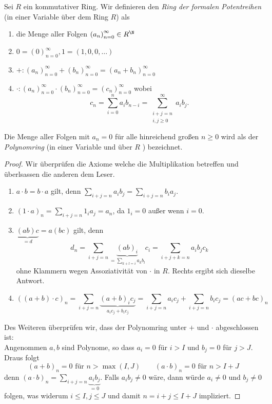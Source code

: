 \begin{definition}
	Sei $R$ ein kommutativer Ring. Wir definieren den \emph{Ring der formalen Potentreihen} (in einer Variable über dem Ring $R $) als 
	\begin{enumerate}
		\item die Menge aller Folgen $\left(a_{n}\right)^{\infty}_{n=0} \in R^{\N}$
		\item $0 = \left(0\right)^{\infty}_{n=0}, 1 = (1,0,0,\ldots)$ 
		\item $+: \left(a_{n}\right)^{\infty}_{n=0} + \left(b_{n}\right)^{\infty}_{n=0} = (a_{n} + b_{n})^{\infty}_{n=0}$ 
		\item $\cdot: \left(a_{n}\right)^{\infty}_{n=0} \cdot \left(b_{n}\right)^{\infty}_{n=0} = \left(c_{n}\right)^{\infty}_{n=0} $ wobei
			\[
				c_{n} = \sum_{i=0}^{n} a_{i} b_{n-i} = \sum_{\substack{i+j=n \\ i,j \geq 0}}^{\infty} a_{i} b_{j}
			.\] 
	\end{enumerate}
	Die Menge aller Folgen mit $a_{n} = 0$ für alle hinreichend großen $n \geq 0$ wird als der \emph{Polynomring} (in einer Variable und über $R$ ) bezeichnet.
\end{definition}

\begin{proof}
	Wir überprüfen die Axiome welche die Multiplikation betreffen und überlsassen die anderen dem Leser.
	\begin{enumerate}
		\item $a\cdot b = b\cdot a$ gilt, denn $\sum_{i+j=n} a_{i} b_{j} = \sum_{i+j=n} b_{i} a_{j}$.
		\item $(1\cdot a)_{n} = \sum_{i+j=n} 1_{i} a_{j} = a_{n}$, da $1_{i} = 0$ außer wenn  $i=0$.
		\item $\underbrace{(ab)c}_{=d} = a(bc)$ gilt, denn
			\[
				d_{n} = \sum_{i+j = n} \underbrace{(ab)_{i}}_{= \sum_{k+l = i} a_{k} b_{l}} c_{i} = \sum_{i+j+k=n} a_{i} b_{j} c_{k}
			\] 
			ohne Klammern wegen Assoziativität von $\cdot $ in $R$. Rechts ergibt sich dieselbe Antwort.
		\item \[((a+b)\cdot c)_{n} = \sum_{i+j=n} \underbrace{(a+b)_{i} c_{j}}_{a_{i} c_{j} + b_{i} c_{j}} = \sum_{i+j=n} a_{i} c_{j} + \sum_{i+j=n} b_{i} c_{j} = (ac +bc)_{n}\]
	\end{enumerate}
	Des Weiteren überprüfen wir, dass der Polynomring unter $+$ und $\cdot $ abgeschlossen ist:\\
	Angenommen $a,b$ sind Polynome, so dass $a_{i} = 0$ für $i > I$ und $b_{j} = 0$ für $j > J$.
	Draus folgt 
	\[
		(a+b)_{n} = 0 \text{ für } n > \max(I,J) \qquad (a\cdot b)_{n} = 0 \text{ für } n > I+J
	\]
	denn $(a\cdot b)_{n} = \sum_{i+j=n} \underbrace{a_{i} b_{j}}_{=0}$. Falls $a_{i} b_{j} \neq  0$ wäre, dann würde $a_{i}\neq 0$ und $b_{j} \neq 0$ folgen,
	was widerum $i \leq I, j \leq J$ und damit $n=i+j \leq I+J$ impliziert.
\end{proof}


